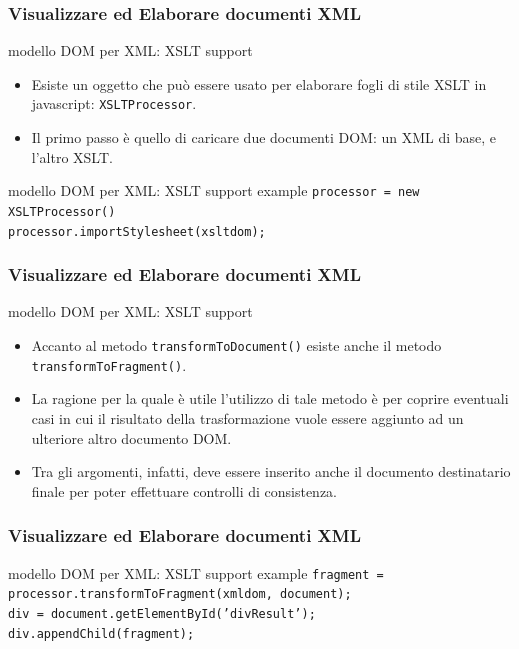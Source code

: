 \begin{frame}
    \frametitle{Visualizzare ed Elaborare documenti XML}
    \addtocounter{nframe}{1}

    \begin{block}{modello DOM per XML: XSLT support}
        \begin{itemize}
            \item Esiste un oggetto che può essere usato per elaborare fogli di stile XSLT in javascript: \texttt{XSLTProcessor}.
            \item Il primo passo è quello di caricare due documenti DOM: un XML di base, e l'altro XSLT.
        \end{itemize}
    \end{block}

    \begin{block}{modello DOM per XML: XSLT support example}
         \texttt{processor = new XSLTProcessor()} 
         \\\texttt{processor.importStylesheet(xsltdom);}
         \\
    \end{block}
     
\end{frame}

\begin{frame}
    \frametitle{Visualizzare ed Elaborare documenti XML}
    \addtocounter{nframe}{1}
    
    \begin{block}{modello DOM per XML: XSLT support}
        \begin{itemize}
            \item Accanto al metodo \texttt{transformToDocument()} esiste anche il metodo \texttt{transformToFragment()}. 
            \item La ragione per la quale è utile l'utilizzo di tale metodo è per coprire eventuali casi in cui il risultato della trasformazione vuole essere aggiunto ad un ulteriore altro documento DOM.
            \item Tra gli argomenti, infatti, deve essere inserito anche il documento destinatario finale per poter effettuare controlli di consistenza.
        \end{itemize}
    \end{block}     
\end{frame}

\begin{frame}
    \frametitle{Visualizzare ed Elaborare documenti XML}
    \addtocounter{nframe}{1}
    

    \begin{block}{modello DOM per XML: XSLT support example}
        \texttt{fragment = processor.transformToFragment(xmldom, document); }
        \\\texttt{div = document.getElementById('divResult'); }
        \\\texttt{div.appendChild(fragment);}
    \end{block}
     
\end{frame}


